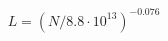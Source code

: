 \documentclass[preview]{standalone}
\begin{document}
\begin{align*}
L = \left(N/8.8 \cdot 10^{13}\right)^{-0.076}
\end{align*}
\end{document}
